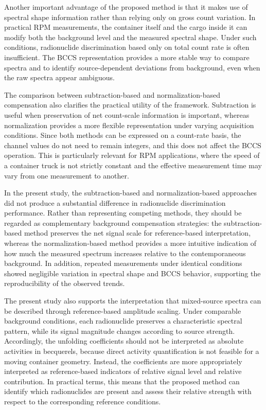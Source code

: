 \documentclass[10pt]{wlscirep}
\begin{document}
Another important advantage of the proposed method is that it makes use of spectral shape information rather than relying only on gross count variation. In practical RPM measurements, the container itself and the cargo inside it can modify both the background level and the measured spectral shape. Under such conditions, radionuclide discrimination based only on total count rate is often insufficient. The BCCS representation provides a more stable way to compare spectra and to identify source-dependent deviations from background, even when the raw spectra appear ambiguous. 

The comparison between subtraction-based and normalization-based compensation also clarifies the practical utility of the framework. Subtraction is useful when preservation of net count-scale information is important, whereas normalization provides a more flexible representation under varying acquisition conditions. Since both methods can be expressed on a count-rate basis, the channel values do not need to remain integers, and this does not affect the BCCS operation. This is particularly relevant for RPM applications, where the speed of a container truck is not strictly constant and the effective measurement time may vary from one measurement to another.

In the present study, the subtraction-based and normalization-based approaches did not produce a substantial difference in radionuclide discrimination performance. Rather than representing competing methods, they should be regarded as complementary background compensation strategies: the subtraction-based method preserves the net signal scale for reference-based interpretation, whereas the normalization-based method provides a more intuitive indication of how much the measured spectrum increases relative to the contemporaneous background. In addition, repeated measurements under identical conditions showed negligible variation in spectral shape and BCCS behavior, supporting the reproducibility of the observed trends.

The present study also supports the interpretation that mixed-source spectra can be described through reference-based amplitude scaling. Under comparable background conditions, each radionuclide preserves a characteristic spectral pattern, while its signal magnitude changes according to source strength. Accordingly, the unfolding coefficients should not be interpreted as absolute activities in becquerels, because direct activity quantification is not feasible for a moving container geometry. Instead, the coefficients are more appropriately interpreted as reference-based indicators of relative signal level and relative contribution. In practical terms, this means that the proposed method can identify which radionuclides are present and assess their relative strength with respect to the corresponding reference conditions.
\end{document}
